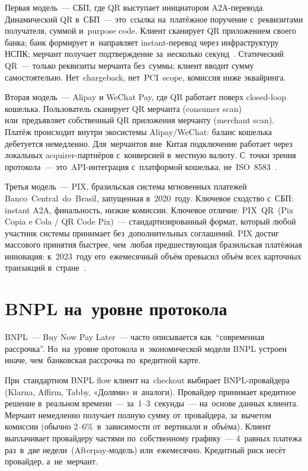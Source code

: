 Первая модель~--- СБП, где QR выступает инициатором A2A-перевода.
Динамический QR в~СБП~--- это~ссылка на~платёжное поручение с~реквизитами
получателя, суммой и~purpose code. Клиент сканирует QR приложением своего банка; банк формирует и~направляет
instant-перевод через инфраструктуру НСПК; мерчант получает подтверждение
за~несколько секунд~. Статический QR~--- только реквизиты
мерчанта без~суммы; клиент вводит сумму самостоятельно. Нет~chargeback,
нет~PCI~scope, комиссия ниже эквайринга.

Вторая модель~--- Alipay и WeChat Pay, где QR работает поверх closed-loop
кошелька. Пользователь
сканирует QR мерчанта (consumer scan) или~предъявляет собственный QR
приложения мерчанту (merchant scan). Платёж происходит внутри экосистемы
Alipay/WeChat: баланс кошелька дебетуется немедленно. Для~мерчантов
вне~Китая подключение работает через локальных acquirer-партнёров с~конверсией
в~местную валюту. С~точки зрения протокола~--- это~API-интеграция
с~платформой кошелька, не~ISO~8583~.

Третья модель~--- PIX, бразильская система мгновенных платежей
Banco~Central~do~Brasil, запущенная в~2020~году.
Ключевое сходство с~СБП: instant A2A, финальность, низкие комиссии.
Ключевое отличие: PIX~QR~(Pix Copia e Cola / QR Code Pix)~--- стандартизированный
формат, который любой участник системы принимает без~дополнительных
соглашений. PIX достиг массового принятия быстрее, чем~любая предшествующая
бразильская платёжная инновация: к~2023~году его~ежемесячный объём
превысил объём всех карточных транзакций в~стране~.


\section{BNPL на~уровне протокола}
\label{sec:alt-bnpl}

BNPL~--- Buy Now Pay Later~--- часто описывается как~\enquote{современная
  рассрочка}. Но~на~уровне протокола и~экономической модели BNPL устроен
иначе, чем~банковская рассрочка по~кредитной карте.

При~стандартном BNPL flow клиент на~checkout выбирает BNPL-провайдера
(Klarna, Affirm, Tabby, «Долями» и~аналоги). Провайдер принимает кредитное
решение в~реальном времени~--- за~1--3~секунды~--- на~основе данных
клиента. Мерчант немедленно получает полную сумму от~провайдера, за~вычетом
комиссии (обычно 2--6\%~в~зависимости от~вертикали и~объёма). Клиент
выплачивает провайдеру частями по~собственному графику~--- 4~равных
платежа раз~в~две недели~(Afterpay-модель) или~ежемесячно. Кредитный
риск несёт провайдер, а~не~мерчант.

